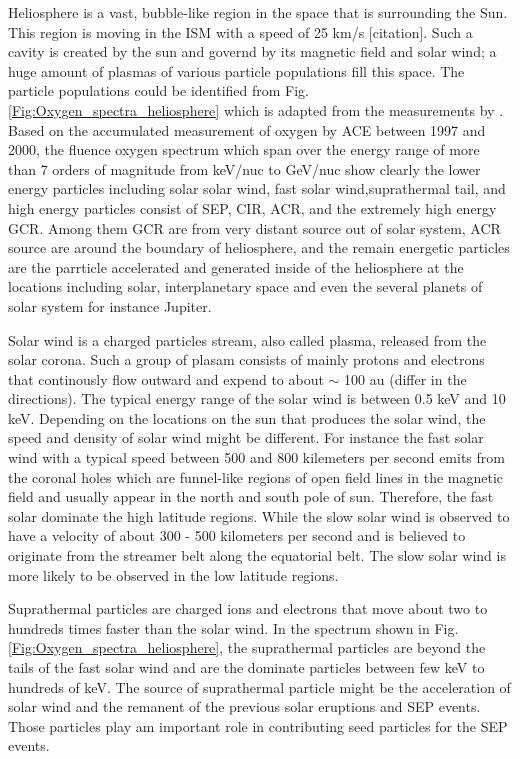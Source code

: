Heliosphere is a vast, bubble-like region in the space that is surrounding the Sun. This region is moving in the \ac{ISM} with a speed of 25 km/s [citation]. Such a cavity is created by the sun and governd by its magnetic field and solar wind; a huge amount of plasmas of various particle populations fill this space. The particle populations could be identified from Fig.\ref{Fig:Oxygen_spectra_heliosphere} which is adapted from the measurements by \citet{Mewaldt-2001}. Based on the accumulated measurement of oxygen by \ac{ACE} between 1997 and 2000, the fluence oxygen spectrum which span over the energy range of more than 7 orders of magnitude from keV/nuc to GeV/nuc show clearly the lower energy particles including solar solar wind, fast solar wind,suprathermal tail, and high energy particles consist of \ac{SEP}, \ac{CIR}, \ac{ACR}, and the extremely high energy \ac{GCR}. 
Among them \acs{GCR} are from very distant source out of solar system, \acs{ACR} source are around the boundary of heliosphere, and the remain energetic particles are the parrticle accelerated and generated inside of the heliosphere at the locations including solar, interplanetary space and even the several planets of solar system for instance Jupiter.

Solar wind is a charged particles stream, also called plasma, released from the solar corona. Such a group of plasam consists of mainly protons and electrons that continously flow outward and expend to about $\sim$ 100 au (differ in the directions). The typical energy range of the solar wind is between 0.5 keV and 10 keV. Depending on the locations on the sun that produces the solar wind, the speed and density of solar wind might be different. For instance the fast solar wind with a typical speed between 500 and 800 kilemeters per second emits from the coronal holes which are funnel-like regions of open field lines in the magnetic field and usually appear in the north and south pole of sun. Therefore, the fast solar dominate the high latitude regions. While the slow solar wind is observed to have a velocity of about 300 - 500 kilometers per second and is believed to originate from the streamer belt along the equatorial belt. The slow solar wind is more likely to be observed in the low latitude regions.


Suprathermal particles are charged ions and electrons that move about two to hundreds times faster than the solar wind. In the spectrum shown in Fig.\ref{Fig:Oxygen_spectra_heliosphere}, the suprathermal particles are beyond the tails of the fast solar wind and are the dominate particles between few keV to hundreds of keV. The source of suprathermal particle might be the acceleration of solar wind and the remanent of the previous solar eruptions and \ac{SEP} events. Those particles play am important role in contributing seed particles for the \acl{SEP}	events.

